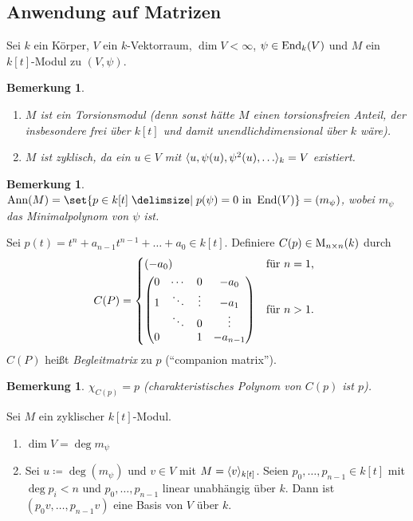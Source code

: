 \documentclass[12pt,a4paper]{scrartcl}
\theoremstyle{cplain}
\theoremstyle{cdef}
\newtheorem{beme}[thmcounter]{Bemerkung}
\begin{document}
\subsection{Anwendung auf Matrizen}
Sei $k$ ein Körper, $V$ ein $k$-Vektorraum, $\dim V<\infty$, $\psi\in \operatorname{End}_k(V)$ und $M$ ein $k[t]$-Modul zu $(V,\psi)$.
\begin{beme} \label{bem:4.18}
	\leavevmode
	\begin{enumerate}
		\item $M$ ist ein Torsionsmodul (denn sonst hätte $M$ einen torsionsfreien Anteil, der insbesondere frei über $k[t]$ und damit unendlichdimensional über $k$ wäre).
		\item $M$ ist zyklisch, da ein $u\in V$ mit $\<u, \psi(u), \psi^2(u),\dots\>_k = V$ existiert.
	\end{enumerate}
\end{beme}
\begin{beme}
	$\Ann(M) = \set{p\in k[t] \given p(\psi) = 0 \text{ in } \End(V)} = (m_{\psi})$, wobei $m_{\psi}$ das Minimalpolynom von $\psi$ ist.
\end{beme}
\begin{defi}
	Sei $p(t) = t^n+a_{n-1}t^{n-1}+\dots + a_0\in k[t]$. Definiere $C(p) \in \operatorname{M}_{n\times n}(k)$ durch \[
		C(P) = \begin{cases*}
			(-a_0) & für $n = 1$, \\
			\begin{pmatrix}
				0 & \cdots & 0 & -a_0 \\ 
				1 & \ddots & \vdots & -a_1 \\ 
				& \ddots & 0 & \vdots \\ 
				0 &  & 1 & -a_{n-1}
			\end{pmatrix} & für $n > 1$.
		\end{cases*}
	\]
	$C(P)$ heißt \emph{Begleitmatrix} zu $p$ (\enquote{companion matrix}).
\end{defi}
\begin{beme}
	$\chi_{C(p)} = p$ (charakteristisches Polynom von $C(p)$ ist $p$).
\end{beme}
\begin{lem} \label{lem:4.22}
	Sei $M$ ein zyklischer $k[t]$-Modul.
	\begin{enumerate}
		\item $\dim V = \deg m_{\psi}$ \label{lem:4.22:i}
		\item Sei $u \coloneqq \deg(m_{\psi})$ und $v\in V$ mit $M = \langle v\rangle_{k[t]}$. Seien $p_0,\dots, p_{n-1}\in k[t]$ mit $\deg p_i<n$ und $p_0,\dots, p_{n-1}$ linear unabhängig über $k$. Dann ist $(p_0v, \dots, p_{n-1}v)$ eine Basis von $V$ über $k$. \label{lem:4.22:ii}
	\end{enumerate}
\end{lem}
\end{document}
